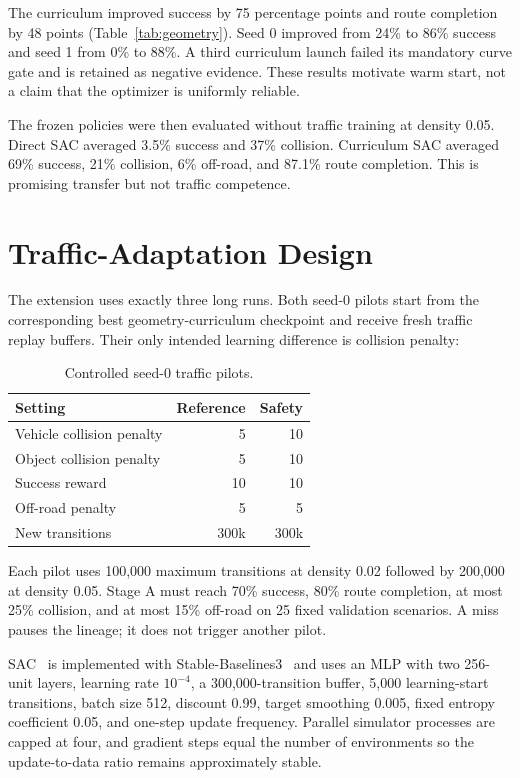 \documentclass[10pt,twocolumn]{article}
\begin{document}
The curriculum improved success by 75 percentage points and route completion by 48
points (Table~\ref{tab:geometry}). Seed 0 improved from 24\% to 86\% success and seed 1
from 0\% to 88\%. A third curriculum launch failed its mandatory curve gate and is
retained as negative evidence. These results motivate warm start, not a claim that the
optimizer is uniformly reliable.

The frozen policies were then evaluated without traffic training at density 0.05.
Direct SAC averaged 3.5\% success and 37\% collision. Curriculum SAC averaged 69\%
success, 21\% collision, 6\% off-road, and 87.1\% route completion. This is promising
transfer but not traffic competence.

\section{Traffic-Adaptation Design}
The extension uses exactly three long runs. Both seed-0 pilots start from the corresponding
best geometry-curriculum checkpoint and receive fresh traffic replay buffers. Their only
intended learning difference is collision penalty:

\begin{table}[t]
\centering
\caption{Controlled seed-0 traffic pilots.}
\label{tab:pilots}
\begin{tabular}{lrr}
\toprule
Setting & Reference & Safety \\
\midrule
Vehicle collision penalty & 5 & 10 \\
Object collision penalty & 5 & 10 \\
Success reward & 10 & 10 \\
Off-road penalty & 5 & 5 \\
New transitions & 300k & 300k \\
\bottomrule
\end{tabular}
\end{table}

Each pilot uses 100,000 maximum transitions at density 0.02 followed by 200,000 at
density 0.05. Stage A must reach 70\% success, 80\% route completion, at most 25\%
collision, and at most 15\% off-road on 25 fixed validation scenarios. A miss pauses
the lineage; it does not trigger another pilot.

SAC~\cite{haarnoja2018sac} is implemented with
Stable-Baselines3~\cite{raffin2021sb3} and uses an MLP with two 256-unit layers,
learning rate $10^{-4}$, a 300,000-transition
buffer, 5,000 learning-start transitions, batch size 512, discount 0.99, target smoothing
0.005, fixed entropy coefficient 0.05, and one-step update frequency. Parallel simulator
processes are capped at four, and gradient steps equal the number of environments so the
update-to-data ratio remains approximately stable.
\end{document}
